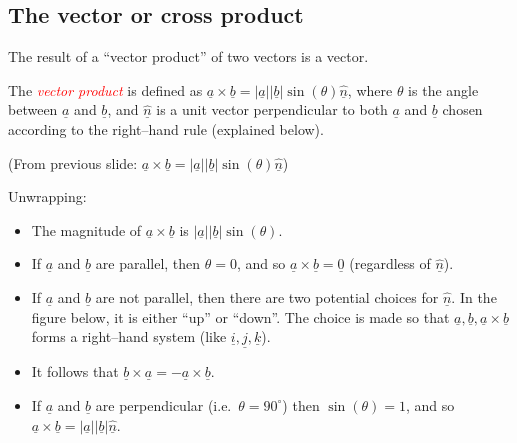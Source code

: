 \documentclass[
  11pt,
  oneside]{book}
\providecommand{\tightlist}{%
  \setlength{\itemsep}{0pt}\setlength{\parskip}{0pt}}
\newcommand{\slide}{}
\theoremstyle{definition}
\theoremstyle{definition}
\theoremstyle{definition}
\theoremstyle{definition}
\theoremstyle{remark}
\begin{document}
\begin{slidesonly}

\slide

\hbox{}
\slide

\end{slidesonly}

\subsection{The vector or cross product}\label{the-vector-or-cross-product}

The result of a ``vector product'' of two vectors is a vector.

The \textcolor{red}{\em vector product} is defined as \(\underline a \times\underline b = |\underline a||\underline b|\sin(\theta)\underline{\hat n}\), where \(\theta\) is the angle between \(\underline{a}\) and \(\underline{b}\), and \(\underline{\hat{n}}\) is a unit vector perpendicular to both \(\underline{a}\) and \(\underline{b}\) chosen according to the right--hand rule (explained below).

\slide

\begin{slidesonly}

(From previous slide: \(\underline a \times\underline b = |\underline a||\underline b|\sin(\theta)\underline{\hat n}\))

\end{slidesonly}

Unwrapping:

\begin{itemize}
\tightlist
\item
  The magnitude of \(\underline a\times\underline b\) is \(|\underline a||\underline b|\sin(\theta)\).
\item
  If \(\underline{a}\) and \(\underline{b}\) are parallel, then \(\theta=0\), and so \(\underline{a}\times\underline{b} = \underline{0}\) (regardless of \(\underline{\hat{n}}\)).
\item
  If \(\underline{a}\) and \(\underline{b}\) are not parallel, then there are two potential choices for \(\underline{\hat{n}}\). In the figure below, it is either ``up'' or ``down''. The choice is made so that \(\underline{a}, \underline{b}, \underline{a}\times\underline{b}\) forms a right--hand system (like \(\underline{i},\underline{j},\underline{k}\)).
\item
  It follows that \(\underline{b}\times \underline{a} = - \underline{a}\times\underline{b}\).
\item
  If \(\underline a\) and \(\underline b\) are perpendicular (i.e.~\(\theta = 90^\circ\)) then \(\sin(\theta)= 1\), and so \(\underline a \times\underline b = |\underline a||\underline b|\underline {\hat n}\).
\end{itemize}
\end{document}

